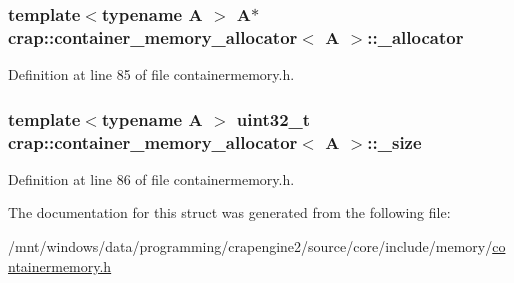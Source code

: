 \subsubsection[{\+\_\+allocator}]{\setlength{\rightskip}{0pt plus 5cm}template$<$typename A $>$ A$\ast$ {\bf crap\+::container\+\_\+memory\+\_\+allocator}$<$ A $>$\+::\+\_\+allocator}\label{structcrap_1_1container__memory__allocator_a6c4b2c56ca010ac510a93d4f5581ba94}


Definition at line 85 of file containermemory.\+h.

\hypertarget{structcrap_1_1container__memory__allocator_afb1717450eb7b0b9d03321fa73a5150f}{}
\subsubsection[{\+\_\+size}]{\setlength{\rightskip}{0pt plus 5cm}template$<$typename A $>$ uint32\+\_\+t {\bf crap\+::container\+\_\+memory\+\_\+allocator}$<$ A $>$\+::\+\_\+size}\label{structcrap_1_1container__memory__allocator_afb1717450eb7b0b9d03321fa73a5150f}


Definition at line 86 of file containermemory.\+h.



The documentation for this struct was generated from the following file\+:\begin{DoxyCompactItemize}
\item 
/mnt/windows/data/programming/crapengine2/source/core/include/memory/\hyperlink{containermemory_8h}{containermemory.\+h}\end{DoxyCompactItemize}
